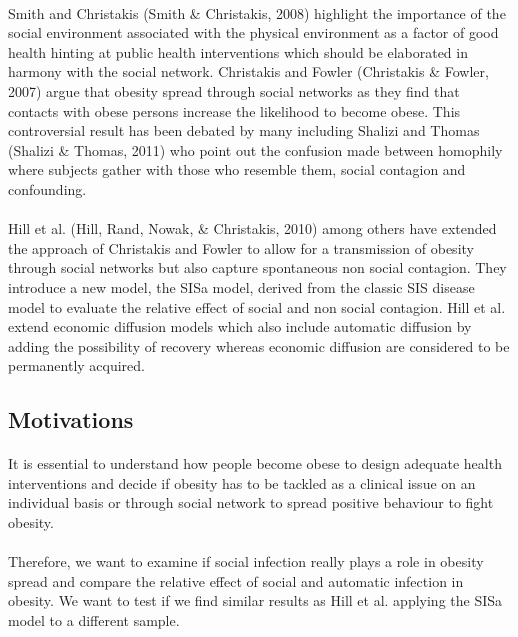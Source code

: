 \documentclass[11pt]{article}
\begin{document}
\paragraph{}
Smith and Christakis (Smith \& Christakis, 2008)  highlight the importance of the social environment associated with the physical environment as a factor of good health hinting at public health interventions which should be elaborated in harmony with the social network. Christakis and Fowler (Christakis \& Fowler, 2007) argue that obesity spread  through social networks as they find that contacts with obese persons increase the likelihood to become obese. This controversial result has been debated by many including Shalizi and Thomas (Shalizi \& Thomas, 2011) who point out the confusion made between homophily where subjects gather with those who resemble them, social contagion and confounding.

\paragraph{}
Hill et al. (Hill, Rand, Nowak, \& Christakis, 2010) among others have extended the approach of Christakis and Fowler to allow for a transmission of obesity through social networks but also capture spontaneous non social contagion. They introduce a new model, the SISa model, derived from the classic SIS disease model to evaluate the relative effect of social and non social contagion. Hill et al. extend economic diffusion models which also include automatic diffusion by adding the possibility of recovery whereas economic diffusion are considered to be permanently acquired.

\subsection{Motivations}
\paragraph{}
It is essential to understand how people become obese to design adequate health interventions and decide if obesity has to be tackled as a clinical issue on an individual basis or through social network to spread positive behaviour to fight obesity.

\paragraph{}
Therefore, we want to examine if social infection really plays a role in obesity spread and compare the  relative effect of social and automatic infection in obesity. We want to test if we find similar results as Hill et al. applying the SISa model to a different sample.
\end{document}
